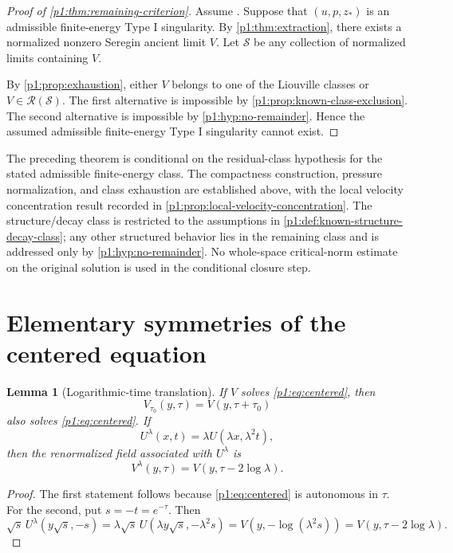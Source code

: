 \documentclass[11pt]{amsart}
\theoremstyle{plain}
\newtheorem{lemma}[lemma]{Lemma}
\theoremstyle{definition}
\theoremstyle{remark}
\numberwithin{equation}{section}
\newcommand{\calS}{\mathcal S}
\newcommand{\calR}{\mathcal R}
\begin{document}
\begin{proof}[Proof of \cref{p1:thm:remaining-criterion}]
Assume .
Suppose that \((u,p,z_*)\) is an admissible finite-energy Type I singularity.
By \cref{p1:thm:extraction}, there exists a normalized nonzero Seregin ancient
limit \(V\).  Let \(\calS\) be any collection of normalized limits containing
\(V\).

By \cref{p1:prop:exhaustion}, either \(V\) belongs to one of the Liouville classes
or \(V\in\calR(\calS)\).  The first alternative is impossible by
\cref{p1:prop:known-class-exclusion}.  The second alternative is impossible by
\cref{p1:hyp:no-remainder}.  Hence the assumed admissible finite-energy Type I
singularity cannot exist.
\end{proof}

The preceding theorem is conditional on the residual-class hypothesis for the
stated admissible finite-energy class.  The compactness construction, pressure
normalization, and class exhaustion are established above, with the local
velocity concentration result recorded in
\cref{p1:prop:local-velocity-concentration}.  The structure/decay class is
restricted to the assumptions in \cref{p1:def:known-structure-decay-class}; any
other structured behavior lies in the remaining class and is addressed only by
\cref{p1:hyp:no-remainder}.  No whole-space critical-norm estimate on the
original solution is used in the conditional closure step.

\section{Elementary symmetries of the centered equation}
\label{p1:app:centered-symmetries}

\begin{lemma}[Logarithmic-time translation]\label{p1:lem:tau-translation}
If \(V\) solves \eqref{p1:eq:centered}, then
\[
   V_{\tau_0}(y,\tau)=V(y,\tau+\tau_0)
\]
also solves \eqref{p1:eq:centered}.  If
\[
   U^\lambda(x,t)=\lambda U(\lambda x,\lambda^2t),
\]
then the renormalized field associated with \(U^\lambda\) is
\[
   V^\lambda(y,\tau)=V(y,\tau-2\log\lambda).
\]
\end{lemma}

\begin{proof}
The first statement follows because \eqref{p1:eq:centered} is autonomous in
\(\tau\).  For the second, put \(s=-t=e^{-\tau}\).  Then
\[
   \sqrt{s}\,U^\lambda(y\sqrt{s},-s)
   =
   \lambda\sqrt{s}\,U(\lambda y\sqrt{s},-\lambda^2s)
   =
   V(y,-\log(\lambda^2s))
   =
   V(y,\tau-2\log\lambda).
\]
\end{proof}
\end{document}

